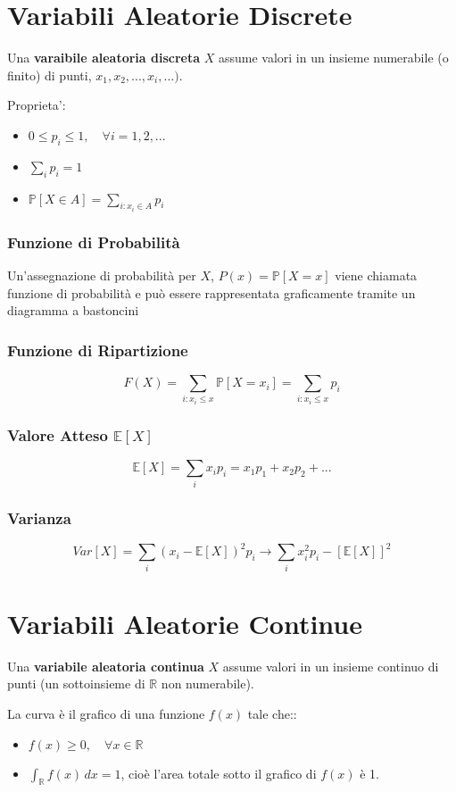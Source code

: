 \section{Variabili Aleatorie Discrete}
\begin{tcolorbox}[title=Variabile Aleatoria Discreta]
Una \textbf{varaibile aleatoria discreta} \(X\) assume valori in un insieme numerabile (o finito) di punti, \({x_1,x_2,...,x_i,...})\).

Proprieta':
\begin{itemize}
    \item \(0 \leq p_i \leq 1,    \quad    \forall i = 1,2,...\)
    \item \(\sum_i p_i = 1\)
    \item \(\mathbb{P}[X \in A] = \sum_{i:x_i \in A}p_i\)
\end{itemize}
\end{tcolorbox}

\subsubsection{Funzione di Probabilità}
Un’assegnazione di probabilità per \(X\), \(P(x) = \mathbb{P}[X = x]\) viene chiamata funzione di probabilità e può essere rappresentata graficamente tramite un diagramma a bastoncini

\subsubsection{Funzione di Ripartizione}
\[F(X) = \sum_{i:x_i\leq x}\mathbb{P}[X = x_i] = \sum_{i:x_i \leq x}p_i\]

\subsubsection{Valore Atteso \(\mathbb{E}[X]\)}
\[\mathbb{E}[X] = \sum_i x_ip_i = x_1p_1 + x_2p_2 + ...\]

\subsubsection{Varianza}
\[Var[X] = \sum_i (x_i - \mathbb{E}[X])^2p_i \rightarrow \sum_ix_i^2p_i - [\mathbb{E}[X]]^2\]

\section{Variabili Aleatorie Continue}
\begin{tcolorbox}[title=Variabile aleatoria continua]
Una \textbf{variabile aleatoria continua} \(X\) assume valori in un insieme continuo di punti (un sottoinsieme di \(\mathbb{R}\) non numerabile).

La curva è il grafico di una funzione \(f(x)\) tale che::
\begin{itemize}
    \item \(f(x) \geq 0, \quad \forall x\in \mathbb{R}\)
    \item \(\int_{\mathbb{R}} f(x)\,dx = 1\), cioè l'area totale sotto il grafico di \(f(x)\) è 1.
\end{itemize}
\end{tcolorbox}

